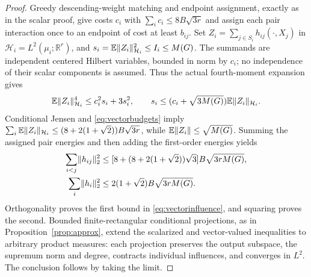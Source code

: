 \begin{proof}
Greedy descending-weight matching and endpoint assignment, exactly as in the scalar proof, give costs $c_i$ with $\sum_i c_i\le8B\sqrt{3r}$ and assign each pair interaction once to an endpoint of cost at least $b_{ij}$. Set
$Z_i=\sum_{j\in S_i}h_{ij}(\cdot,X_j)$ in $\mathcal H_i=L^2(\mu_i;\mathbb R^r)$, and
$s_i=\mathbb E\lVert Z_i\rVert_{\mathcal H_i}^2\le I_i\le M(G)$.
The summands are independent centered Hilbert variables, bounded in norm by $c_i$; no independence of their scalar components is assumed. Thus the actual fourth-moment expansion gives
\[
 \mathbb E\lVert Z_i\rVert_{\mathcal H_i}^4\le c_i^2s_i+3s_i^2,
 \qquad s_i\le(c_i+\sqrt{3M(G)})\mathbb E\lVert Z_i\rVert_{\mathcal H_i}.
\]
Conditional Jensen and \eqref{eq:vectorbudgets} imply
$\sum_i\mathbb E\lVert Z_i\rVert_{\mathcal H_i}\le(8+2(1+\sqrt2))B\sqrt{3r}$,
while $\mathbb E\lVert Z_i\rVert\le\sqrt{M(G)}$. Summing the assigned pair energies and then adding the first-order energies yields
\[
 \begin{aligned}
 \sum_{i<j}\lVert h_{ij}\rVert_2^2
 &\le[8+(8+2(1+\sqrt2))\sqrt3]B\sqrt{3r M(G)},\\
 \sum_i\lVert h_i\rVert_2^2
 &\le2(1+\sqrt2) B\sqrt{3r M(G)}.
 \end{aligned}
\]
Orthogonality proves the first bound in \eqref{eq:vectorinfluence}, and squaring proves the second.
Bounded finite-rectangular conditional projections, as in Proposition~\ref{prop:approx}, extend the scalarized and vector-valued inequalities to arbitrary product measures: each projection preserves the output subspace, the supremum norm and degree, contracts individual influences, and converges in $L^2$. The conclusion follows by taking the limit.
\end{proof}

